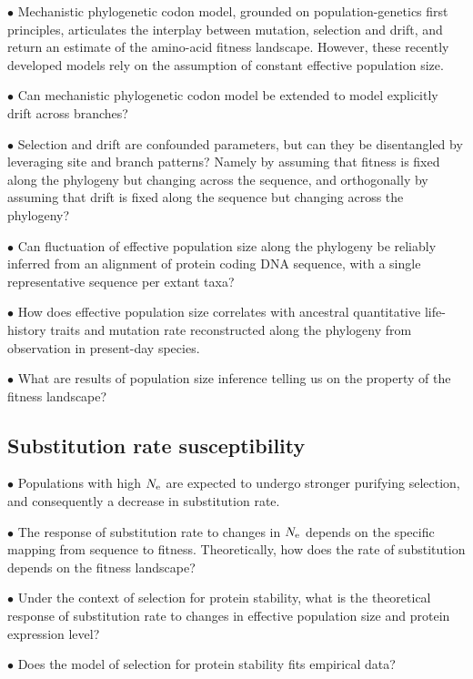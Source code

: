 $\bullet$ Mechanistic phylogenetic codon model, grounded on population-genetics first principles, articulates the interplay between mutation, selection and drift, and return an estimate of the amino-acid fitness landscape.
However, these recently developed models rely on the assumption of constant effective population size.

$\bullet$ Can mechanistic phylogenetic codon model be extended to model explicitly drift across branches?

$\bullet$ Selection and drift are confounded parameters, but can they be disentangled by leveraging site and branch patterns?
Namely by assuming that fitness is fixed along the phylogeny but changing across the sequence, and orthogonally by assuming that drift is fixed along the sequence but changing across the phylogeny?

$\bullet$ Can fluctuation of effective population size along the phylogeny be reliably inferred from an alignment of protein coding DNA sequence, with a single representative sequence per extant taxa?

$\bullet$ How does effective population size correlates with ancestral quantitative life-history traits and mutation rate reconstructed along the phylogeny from observation in present-day species.

$\bullet$ What are results of population size inference telling us on the property of the fitness landscape?

\subsection{Substitution rate susceptibility}

$\bullet$ Populations with high $N_{\textrm{e}}$ are expected to undergo stronger purifying selection, and consequently a decrease in substitution rate.

$\bullet$ The response of substitution rate to changes in $N_{\textrm{e}}$ depends on the specific mapping from sequence to fitness.
Theoretically, how does the rate of substitution depends on the fitness landscape?

$\bullet$ Under the context of selection for protein stability, what is the theoretical response of substitution rate to changes in effective population size and protein expression level?

$\bullet$ Does the model of selection for protein stability fits empirical data?

